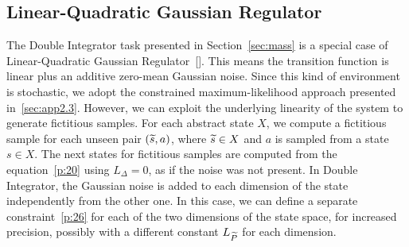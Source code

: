 \subsection{Linear-Quadratic Gaussian Regulator}\label{subsec:app2.4}
The Double Integrator task presented in Section~\ref{sec:mass} is a special case of Linear-Quadratic Gaussian Regulator~[\cite{peters2002policy}]. This means the transition function is linear plus an additive zero-mean Gaussian noise.
Since this kind of environment is stochastic, we adopt the constrained maximum-likelihood approach presented in~\ref{sec:app2.3}. 
However, we can exploit the underlying linearity of the system to generate fictitious samples.
For each abstract state $X$, we compute a fictitious sample for each unseen pair $(\widetilde{s}, a)$, where $\widetilde{s} \in X$ and $a$ is sampled from a state $s \in X$. The next states for fictitious samples are computed from the equation~\eqref{p:20} using $L_{\Delta}=0$, as if the noise was not present. 
In Double Integrator, the Gaussian noise is added to each dimension of the state independently from the other one. 
In this case, we can define a separate constraint~\eqref{p:26} for each of the two dimensions of the state space, for increased precision, possibly with a different constant $L_{\widetilde{P}}$ for each dimension. 
